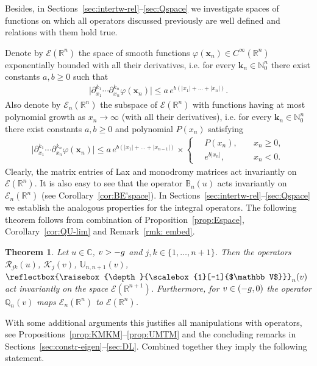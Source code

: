 \documentclass[11pt]{article}
\numberwithin{equation}{section}
\theoremstyle{plain}
\newtheorem{theorem}{Theorem}
\theoremstyle{definition}
\newcommand{\bbLambda}{\reflectbox{\raisebox{\depth}{\scalebox{1}[-1]{$\mathbb V$}}}}
\newcommand{\LLambda}{\bbLambda}
\newcommand{\QQ}{\mathbb{Q}}
\newcommand{\MMO}{\mathbb{U}}
\let\Im\relax
\DeclareMathOperator{\Im}{Im}
\renewcommand{\phi}{\varphi}
\begin{document}
Besides, in Sections~\ref{sec:intertw-rel}--\ref{sec:Qspace} we investigate spaces of functions on which all operators discussed previously are well defined and relations with them hold true. 

Denote by $\mathcal{E}(\mathbb{R}^n)$ the space of smooth functions $\phi(\bm{x}_n) \in C^\infty(\mathbb{R}^n)$ exponentially bounded with all their derivatives, i.e. for every $\bm{k}_n \in \mathbb{N}_0^n$ there exist constants $a, b \geq 0$ such that
\begin{align} 
	\bigl| \partial_{x_1}^{k_1} \cdots \partial_{x_n}^{k_n}  \phi (\bm{x}_n) \bigr| \leq a \, e^{b (|x_1| + \ldots + |x_n|)}.
\end{align}
Also denote by $\mathcal{E}_n(\mathbb{R}^n)$ the subspace of $\mathcal{E}(\mathbb{R}^n)$ with functions having at most polynomial growth as $x_n \to \infty$ (with all their derivatives), i.e. for every $\bm{k}_n \in \mathbb{N}_0^n$ there exist constants $a, b \geq 0$ and polynomial $P(x_n)$ satisfying
\begin{align}
	\bigl| \partial_{x_1}^{k_1} \cdots \partial_{x_n}^{k_n} \phi(\bm{x}_n) \bigr| \leq a \, e^{b(|x_1| + \ldots + |x_{n - 1}|)} \times
	\left\{ \begin{aligned}
		& \, P(x_n), && \; x_n \geq 0, \\[6pt]
		& \, e^{b |x_n|}, && \; x_n < 0.
	\end{aligned}  \right.
\end{align}
Clearly, the matrix entries of Lax and monodromy matrices act invariantly on $\mathcal{E}(\mathbb{R}^n)$. It is also easy to see that the operator $\mathbb{B}_n(u)$ acts invariantly on $\mathcal{E}_n(\mathbb{R}^n)$ (see Corollary~\ref{cor:BE'space}). In Sections~\ref{sec:intertw-rel}--\ref{sec:Qspace} we establish the analogous properties for the integral operators. The following theorem follows from combination of Proposition~\ref{prop:Espace}, Corollary~\ref{cor:QU-lim} and Remark~\ref{rmk: embed}.

\begin{theorem} \label{thm:spaces}
	Let $u\in \mathbb{C}$, $\Im v > -g$ and $j, k \in \{1, \ldots, n + 1\}$. Then the operators $\mathcal{R}_{jk}(u)$, $\mathcal{K}_j(v)$, $\MMO_{n, n+1}(v)$, $\LLambda_n(v)$ act invariantly on the space $\mathcal{E}(\mathbb{R}^{n + 1})$. Furthermore, for $\Im v \in (-g, 0)$ the operator $\QQ_n(v)$ maps $\mathcal{E}_n(\mathbb{R}^n)$ to $\mathcal{E}(\mathbb{R}^n)$.
\end{theorem}

With some additional arguments this justifies all manipulations with operators, see Propositions~\ref{prop:KMKM}--\ref{prop:UMTM} and the concluding remarks in Sections~\ref{sec:constr-eigen}--\ref{sec:DL}. Combined together they imply the following statement.
\end{document}
